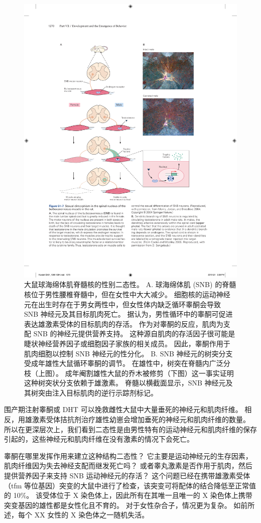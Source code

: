\begin{figure}[htbp]
	\centering
	\includegraphics[width=0.8\linewidth]{chap51/fig_51_7}
	\caption{大鼠球海绵体肌脊髓核的性别二态性。
		A. 球海绵体肌 (SNB) 的脊髓核位于男性腰椎脊髓中，但在女性中大大减少。
		细胞核的运动神经元在出生时存在于男女两性中，但女性体内缺乏循环睾酮会导致 SNB 神经元及其目标肌肉死亡。
		据认为，男性循环中的睾酮可促进表达雄激素受体的目标肌肉的存活。
		作为对睾酮的反应，肌肉为支配 SNB 的神经元提供营养支持。
		这种源自肌肉的存活因子很可能是睫状神经营养因子或细胞因子家族的相关成员。
		因此，睾酮作用于肌肉细胞以控制 SNB 神经元的性分化\cite{morris2004sexual}。
		B. SNB 神经元的树突分支受成年雄性大鼠循环睾酮的调节。
		在雄性中，树突在脊髓内广泛分枝（上图）。
		成年阉割雄性大鼠的乔木被修剪（下图）这一事实证明这种树突状分支依赖于雄激素。
		脊髓以横截面显示，SNB 神经元及其树突由注入目标肌肉的逆行示踪剂标记\cite{cooke2005gonadal}。}
	\label{fig:51_7}
\end{figure}


围产期注射睾酮或 DHT 可以挽救雌性大鼠中大量垂死的神经元和肌肉纤维。
相反，用雄激素受体拮抗剂治疗雄性幼崽会增加垂死的神经元和肌肉纤维的数量。
所以在更深层次上，我们看到二态性是由男性特有的运动神经元和肌肉纤维的保存引起的，这些神经元和肌肉纤维在没有激素的情况下会死亡。


睾酮在哪里发挥作用来建立这种结构二态性？
它主要是运动神经元的生存因素，肌肉纤维因为失去神经支配而继发死亡吗？
或者睾丸激素是否作用于肌肉，然后提供营养因子来支持 SNB 运动神经元的存活？
这个问题已经在携带雄激素受体（tfm 等位基因）突变的大鼠中进行了检查，该突变可将配体的结合降低至正常值的 10\%。
该受体位于 X 染色体上，因此所有在其唯一且唯一的 X 染色体上携带突变基因的雄性都是女性化且不育的。
对于女性杂合子，情况更为复杂。
如前所述，每个 XX 女性的 X 染色体之一随机失活。


